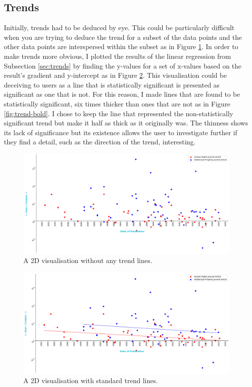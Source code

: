 		\subsection{Trends}
			Initially, trends had to be deduced by eye. This could be particularly difficult when you are trying to deduce the trend for a subset of the data points and the other data points are interspersed within the subset as in Figure \ref{fig:trend-none}. In order to make trends more obvious, I plotted the results of the linear regression from Subsection \ref{sec:trends} by finding the y-values for a set of x-values based on the result's gradient and y-intercept as in Figure \ref{fig:trend-not-bold}. This visualisation could be deceiving to users as a line that is statistically significant is presented as significant as one that is not. For this reason, I made lines that are found to be statistically significant, six times thicker than ones that are not as in Figure \ref{fig:trend-bold}. I chose to keep the line that represented the non-statistically significant trend but make it half as thick as it originally was. The thinness shows its lack of significance but its existence allows the user to investigate further if they find a detail, such as the direction of the trend, interesting.
			\begin{figure}
    			\centering
    			\includegraphics[width=0.9\linewidth]{resources/images/trend_none.png}
    			\caption{A 2D visualisation without any trend lines.}
    			\label{fig:trend-none}
			\end{figure}
			\begin{figure}
    			\centering
    			\includegraphics[width=0.9\linewidth]{resources/images/trend_not_bold.png}
    			\caption{A 2D visualisation with standard trend lines.}
    			\label{fig:trend-not-bold}
			\end{figure}
